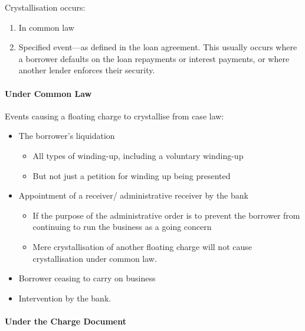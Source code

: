 \documentclass[
]{article}
\providecommand{\tightlist}{%
  \setlength{\itemsep}{0pt}\setlength{\parskip}{0pt}}
\begin{document}
Crystallisation occurs:

\begin{enumerate}
\tightlist
\item
  In common law
\item
  Specified event---as defined in the loan agreement. This usually
  occurs where a borrower defaults on the loan repayments or interest
  payments, or where another lender enforces their security.
\end{enumerate}

\hypertarget{under-common-law}{%
\paragraph{Under Common Law}\label{under-common-law}}

Events causing a floating charge to crystallise from case law:

\begin{itemize}
\tightlist
\item
  The borrower's liquidation

  \begin{itemize}
  \tightlist
  \item
    All types of winding-up, including a voluntary winding-up
  \item
    But not just a petition for winding up being presented
  \end{itemize}
\item
  Appointment of a receiver/ administrative receiver by the bank

  \begin{itemize}
  \tightlist
  \item
    If the purpose of the administrative order is to prevent the
    borrower from continuing to run the business as a going concern
  \item
    Mere crystallisation of another floating charge will not cause
    crystallisation under common law.
  \end{itemize}
\item
  Borrower ceasing to carry on business
\item
  Intervention by the bank.
\end{itemize}

\hypertarget{under-the-charge-document}{%
\paragraph{Under the Charge Document}\label{under-the-charge-document}}
\end{document}
